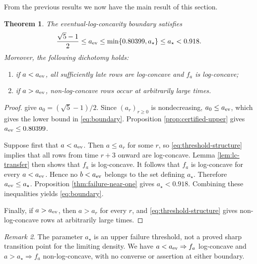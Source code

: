 \documentclass[11pt]{article}
\numberwithin{equation}{section}
\newtheorem{theorem}{Theorem}[section]
\theoremstyle{remark}
\newtheorem{remark}[theorem]{Remark}
\begin{document}

From the previous results we now have the main result of this section.

\begin{theorem}\label{thm:boundary}
The eventual-log-concavity boundary satisfies
\begin{equation}\label{eq:boundary}
\frac{\sqrt5-1}{2}
\leq a_{\rm ev}
\leq \min\{0.80399,a_\star\}
\leq a_\star<0.918.
\end{equation}
Moreover, the following dichotomy holds:
\begin{enumerate}
\item if $a<a_{\rm ev}$, all sufficiently late rows are log-concave
and $f_a$ is log-concave;
\item if $a>a_{\rm ev}$, non-log-concave rows occur at arbitrarily
large times.
\end{enumerate}
\end{theorem}

\begin{proof}
\cite[Proposition 2.2 and Remark 2.3]
{guerin-laulin-raschel-simon} give $a_0=(\sqrt5-1)/2$. Since $(a_r)_{r\geq0}$ is nondecreasing,
$a_0\leq a_{\rm ev}$, which gives the lower bound in
\eqref{eq:boundary}. Proposition \ref{prop:certified-upper} gives $a_{\rm ev}\leq0.80399$.

Suppose first that $a<a_{\rm ev}$. Then $a\leq a_r$ for some $r$, so
\eqref{eq:threshold-structure} implies that all rows from time $r+3$
onward are log-concave. Lemma \ref{lem:lc-transfer} then shows that $f_a$ is log-concave. It follows that $f_a$ is log-concave for every
$a<a_{\rm ev}$. Hence no $b<a_{\rm ev}$ belongs to the set defining $a_\star$. Therefore $a_{\rm ev}\leq a_\star$. Proposition \ref{thm:failure-near-one} gives
$a_\star<0.918$. Combining these inequalities yields \eqref{eq:boundary}.

Finally, if $a>a_{\rm ev}$, then $a>a_r$ for every $r$, and \eqref{eq:threshold-structure} gives non-log-concave rows at arbitrarily large times.
\end{proof}

\begin{remark}
The parameter $a_\star$ is an upper failure threshold, not a proved sharp
transition point for the limiting density. We have
$a<a_{\rm ev}\Rightarrow f_a$ log-concave and $a>a_\star\Rightarrow f_a$
non-log-concave, with no converse or assertion at either boundary.
\end{remark}
\end{document}
